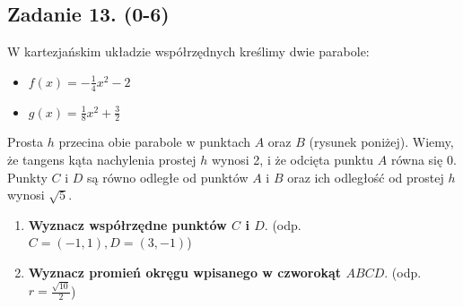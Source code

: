 \documentclass[11pt,a4paper]{scrartcl}
\theoremstyle{definition}
\begin{document}
\subsection*{Zadanie 13. (0-6)}
W kartezjańskim układzie współrzędnych kreślimy dwie parabole:
\begin{itemize}
    \item $f(x) = -\frac{1}{4}x^2-2$
    \item $g(x) = \frac{1}{8}x^2 + \frac{3}{2}$
\end{itemize}
Prosta $h$ przecina obie parabole w punktach $A$ oraz $B$ (rysunek poniżej). Wiemy, że tangens kąta nachylenia prostej $h$ wynosi 2, i że odcięta punktu $A$ równa się $0$. Punkty $C$ i $D$ są równo odległe od punktów $A$ i $B$ oraz ich odległość od prostej $h$ wynosi $\sqrt{5}$. 

\begin{figure}[H]
\def\svgwidth{0.55\columnwidth}
\centering

\end{figure}

\begin{enumerate}
    \item \textbf{Wyznacz współrzędne punktów $C$ i $D$}. (odp. $C=(-1,1), D=(3,-1)$)
    \item \textbf{Wyznacz promień okręgu wpisanego w czworokąt $ABCD$}. (odp. $r=\frac{\sqrt{10}}{2}$)

\end{enumerate}
\end{document}
